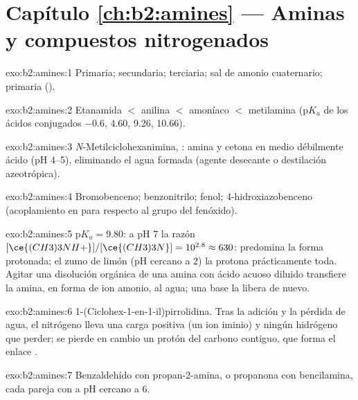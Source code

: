 \section*{Capítulo \ref{ch:b2:amines} --- Aminas y compuestos nitrogenados}

\begin{solution}{exo:b2:amines:1}
Primaria; secundaria; terciaria; sal de amonio cuaternario; primaria ().
\end{solution}

\begin{solution}{exo:b2:amines:2}
Etanamida $<$ anilina $<$ amoníaco $<$ metilamina ($\mathrm pK_a$ de los ácidos conjugados
$-0.6$, 4.60, 9.26, 10.66).
\end{solution}

\begin{solution}{exo:b2:amines:3}
\textit{N}-Metilciclohexanimina, : amina y cetona en medio débilmente ácido
(pH 4--5), eliminando el agua formada (agente desecante o destilación azeotrópica).
\end{solution}

\begin{solution}{exo:b2:amines:4}
Bromobenceno; benzonitrilo; fenol; 4-hidroxiazobenceno  (acoplamiento en para respecto al
grupo  del fenóxido).
\end{solution}

\begin{solution}{exo:b2:amines:5}
$\mathrm pK_a = 9.80$: a pH 7 la razón $[\ce{(CH3)3NH+}]/[\ce{(CH3)3N}] = 10^{2.8} \approx 630$: predomina la
forma protonada; el zumo de limón (pH cercano a 2) la protona prácticamente toda. Agitar una
disolución orgánica de una amina con ácido acuoso diluido transfiere la amina, en forma de ion amonio,
al agua; una base la libera de nuevo.
\end{solution}

\begin{solution}{exo:b2:amines:6}
1-(Ciclohex-1-en-1-il)pirrolidina. Tras la adición y la pérdida de agua, el nitrógeno lleva una
carga positiva (un ion iminio) y ningún hidrógeno que perder; se pierde en cambio un protón del carbono
contiguo, que forma el enlace .
\end{solution}

\begin{solution}{exo:b2:amines:7}
Benzaldehído con propan-2-amina, o propanona con bencilamina, cada pareja con  a pH
cercano a 6.
\end{solution}

